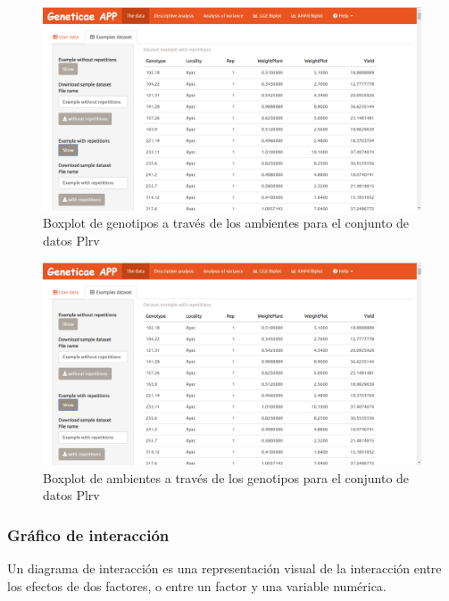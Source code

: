 \begin{figure}[H]
	\begin{center}
		\includegraphics[width=17cm]{./Graficos/Exampledatasets_withrep.png}
	\end{center}
	\caption{Boxplot de genotipos a través de los ambientes para el conjunto de datos Plrv}
	\label{fig:fig47}
\end{figure}


\begin{figure}[H]
	\begin{center}
		\includegraphics[width=17cm]{./Graficos/Exampledatasets_withrep.png}
	\end{center}
	\caption{Boxplot de ambientes a través de los genotipos para el conjunto de datos Plrv}
	\label{fig:fig48}
\end{figure}

\subsubsection{Gráfico de interacción}
Un diagrama de interacción es una representación visual de la interacción entre los efectos de dos factores, o entre un factor y una variable numérica. 

